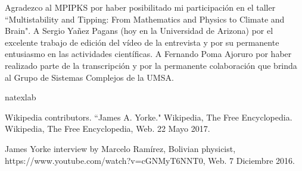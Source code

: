 \documentclass{rbf}
\begin{document}
\begin{acknowledgments}
Agradezco al MPIPKS por haber posibilitado mi participación en el taller ``Multistability and Tipping: From Mathematics and Physics to Climate and Brain". A Sergio Yañez Pagans (hoy en la Universidad de Arizona) por el excelente trabajo de edición del vídeo de la entrevista y por su permanente entusiasmo en las actividades científicas. A Fernando Poma Ajoruro por haber realizado parte de la transcripción y por la permanente colaboración que brinda al Grupo de Sistemas Complejos de la UMSA.
\end{acknowledgments}

\begin{thebibliography}{32}
\expandafter\ifx\csname natexlab\endcsname\relax\def\natexlab#1{#1}\fi

Wikipedia contributors. ``James A. Yorke." Wikipedia, The Free Encyclopedia. Wikipedia, The Free Encyclopedia, Web. 22 Mayo 2017.



James Yorke interview by Marcelo Ramírez, Bolivian physicist, https://www.youtube.com/watch?v=cGNMyT6NNT0, Web. 7 Diciembre 2016.
\end{thebibliography}
\end{document}
